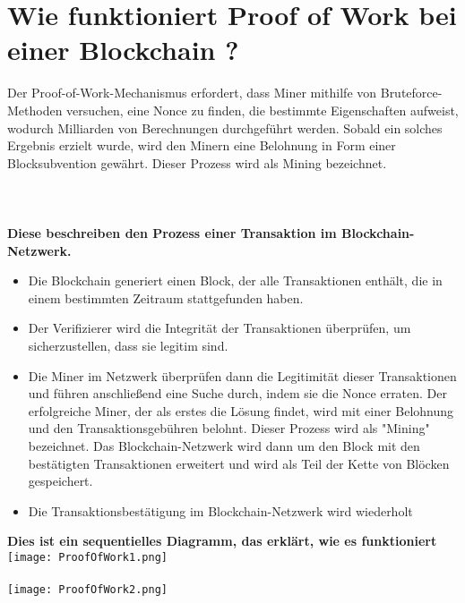 \documentclass[ngerman]{scrreprt}
\begin{document}
\section{Wie funktioniert Proof of Work bei einer Blockchain ?}
Der Proof-of-Work-Mechanismus erfordert, dass Miner mithilfe von Bruteforce-Methoden versuchen, eine Nonce zu finden, die bestimmte Eigenschaften aufweist, wodurch Milliarden von Berechnungen durchgeführt werden. Sobald ein solches Ergebnis erzielt wurde, wird den Minern eine Belohnung in Form einer Blocksubvention gewährt. Dieser Prozess wird als Mining bezeichnet.\\ \\ \\ \\
\textbf{Diese beschreiben den Prozess einer Transaktion im Blockchain-Netzwerk. \\ }
\begin{itemize}
	\item{Die Blockchain generiert einen Block, der alle Transaktionen enthält, die in einem bestimmten Zeitraum stattgefunden haben.}
	\item{Der Verifizierer wird die Integrität der Transaktionen überprüfen, um sicherzustellen, dass sie legitim sind. \cite{btc-echo-proof-of-work}}
	\item{Die Miner im Netzwerk überprüfen dann die Legitimität dieser Transaktionen und führen anschließend eine Suche durch, indem sie die Nonce erraten. Der erfolgreiche Miner, der als erstes die Lösung findet, wird mit einer Belohnung und den Transaktionsgebühren belohnt. Dieser Prozess wird als "Mining" bezeichnet. Das Blockchain-Netzwerk wird dann um den Block mit den bestätigten Transaktionen erweitert und wird als Teil der Kette von Blöcken gespeichert.\cite{btc-echo-proof-of-work}}
	\item{Die Transaktionsbestätigung im Blockchain-Netzwerk wird wiederholt \\}
	
\end{itemize}
\textbf{Dies ist ein sequentielles Diagramm, das erklärt, wie es funktioniert \\}
\texttt{[image: ProofOfWork1.png]} \\ \\
\texttt{[image: ProofOfWork2.png]}
\end{document}

